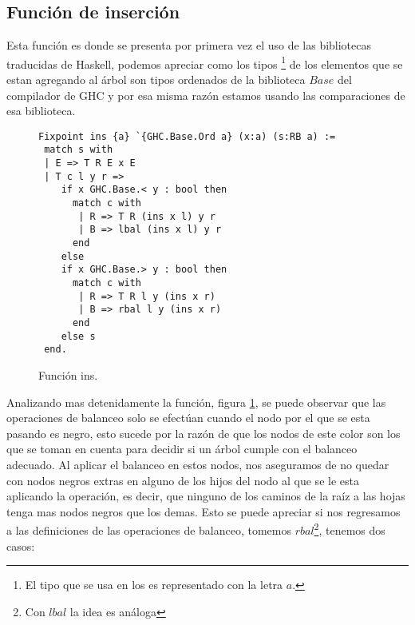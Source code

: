 \subsection {Funci\'on de inserci\'on}
Esta funci\'on es donde se presenta por primera vez el uso de las bibliotecas traducidas de
Haskell, podemos apreciar como los tipos \footnote{El tipo que se usa en los \arns es representado
con la letra $a$.} de los elementos que se estan agregando al \'arbol son tipos ordenados de la
biblioteca $Base$ del compilador de GHC y por esa misma raz\'on estamos usando las comparaciones de
esa biblioteca.
\begin{figure}
\centering
\captionsetup{justification=centering}
\begin{verbatim}
Fixpoint ins {a} `{GHC.Base.Ord a} (x:a) (s:RB a) :=
 match s with
 | E => T R E x E
 | T c l y r =>
    if x GHC.Base.< y : bool then
      match c with
       | R => T R (ins x l) y r
       | B => lbal (ins x l) y r
      end
    else
    if x GHC.Base.> y : bool then
      match c with
       | R => T R l y (ins x r)
       | B => rbal l y (ins x r)
      end
    else s
 end.
\end{verbatim}
\caption{Funci\'on ins.}
\label{func_ins}
\end{figure}

Analizando mas detenidamente la funci\'on, figura \ref{func_ins}, se puede observar que las
operaciones de balanceo solo se efectúan cuando el nodo por el que se esta pasando es negro, esto
sucede por la raz\'on de que los nodos de este color son los que se toman en cuenta para decidir si
un \'arbol cumple con el balanceo adecuado. Al aplicar el balanceo en estos nodos, nos aseguramos
de no quedar con nodos negros extras en alguno de los hijos del nodo al que se le esta aplicando la
operación, es decir, que ninguno de los caminos de la ra\'iz a las hojas tenga mas nodos negros que
los demas. Esto se puede apreciar si nos regresamos a las definiciones de las operaciones de
balanceo, tomemos $rbal$\footnote{Con $lbal$ la idea es an\'aloga}, tenemos dos casos:

